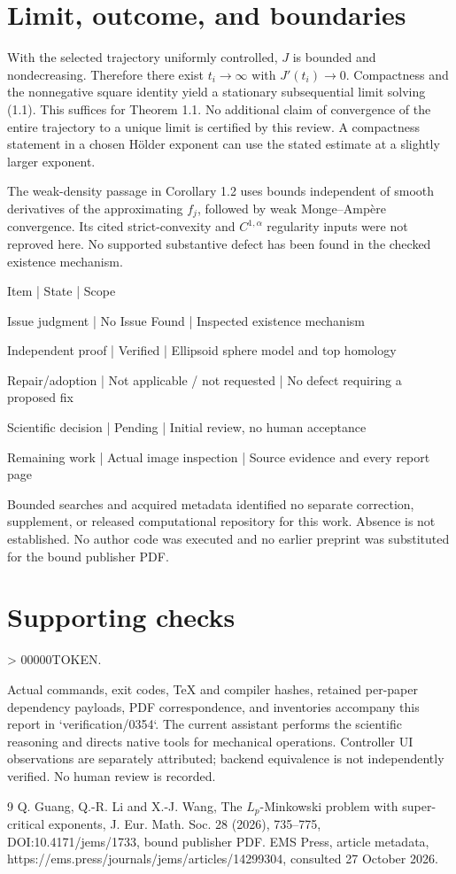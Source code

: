 \documentclass[10pt]{article}
\begin{document}
\section*{Limit, outcome, and boundaries}
With the selected trajectory uniformly controlled, \(J\) is bounded and nondecreasing. Therefore there exist \(t_i\to\infty\) with \(J'(t_i)\to0\). Compactness and the nonnegative square identity yield a stationary subsequential limit solving (1.1). This suffices for Theorem 1.1. No additional claim of convergence of the entire trajectory to a unique limit is certified by this review. A compactness statement in a chosen Hölder exponent can use the stated estimate at a slightly larger exponent.\par
The weak-density passage in Corollary 1.2 uses bounds independent of smooth derivatives of the approximating \(f_j\), followed by weak Monge–Ampère convergence. Its cited strict-convexity and \(C^{1,\alpha}\) regularity inputs were not reproved here. No supported substantive defect has been found in the checked existence mechanism.\par
Item | State | Scope\par
Issue judgment | No Issue Found | Inspected existence mechanism\par
Independent proof | Verified | Ellipsoid sphere model and top homology\par
Repair/adoption | Not applicable / not requested | No defect requiring a proposed fix\par
Scientific decision | Pending | Initial review, no human acceptance\par
Remaining work | Actual image inspection | Source evidence and every report page\par
Bounded searches and acquired metadata identified no separate correction, supplement, or released computational repository for this work. Absence is not established. No author code was executed and no earlier preprint was substituted for the bound publisher PDF.\par
\section*{Supporting checks}
> 00000TOKEN.\par
Actual commands, exit codes, TeX and compiler hashes, retained per-paper dependency payloads, PDF correspondence, and inventories accompany this report in `verification/0354`. The current assistant performs the scientific reasoning and directs native tools for mechanical operations. Controller UI observations are separately attributed; backend equivalence is not independently verified. No human review is recorded.\par
9 Q. Guang, Q.-R. Li and X.-J. Wang, The \(L_p\)-Minkowski problem with super-critical exponents, J. Eur. Math. Soc. 28 (2026), 735–775, DOI:10.4171/jems/1733, bound publisher PDF. EMS Press, article metadata, https://ems.press/journals/jems/articles/14299304, consulted 27 October 2026.\par
\end{document}
